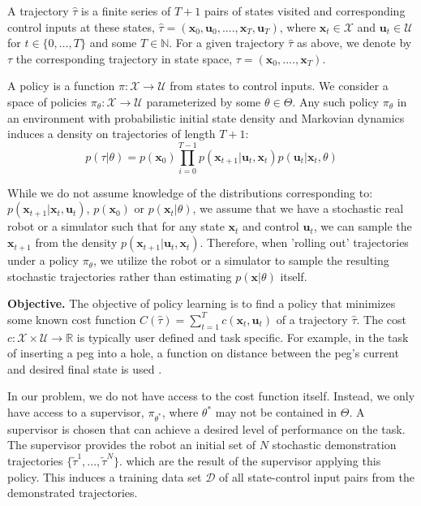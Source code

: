 \documentclass[10pt, conference]{ieeeconf}      %
\newcommand{\bu}{\mathbf{u}}
\newcommand{\bx}{\mathbf{x}}
\begin{document}
A trajectory $\hat{\tau}$ is a finite series of $T+1$ pairs of states visited and corresponding
control inputs at these states, $\hat{\tau} = (\mathbf{x}_0,\mathbf{u}_0, ...., \mathbf{x}_T,\mathbf{u}_T)$, where $\bx_t\in \mathcal{X}$
and $\bu_t\in \mathcal{U}$ for $t\in \{0, \ldots, T\}$ and some $T\in \mathbb{N}$.  
For a given trajectory $\hat{\tau}$ as above, we denote by ${\tau}$ the corresponding trajectory in state space,
${\tau} = (\bx_0,....,\bx_T)$.


A policy is a function $\pi: \mathcal{X} \to \mathcal{U}$ from states to control inputs. 
We consider a space of policies $\pi_{\theta}:\mathcal{X}\to \mathcal{U}$ parameterized by some $\theta\in \Theta$. Any such policy $\pi_{\theta}$ in an environment with probabilistic initial state density and Markovian dynamics
induces a density on trajectories of length $T+1$: $$p(\tau | \theta)=
p(\bx_0)\prod_{i=0}^{T-1}p(\bx_{t+1}|\bu_t,\bx_t)p(\bu_t|\bx_t,\theta)$$


While we do not assume knowledge of the distributions corresponding to: $p(\bx_{t+1}|\bx_t,\bu_t)$, $p(\bx_0)$ or $p(\bx_t|
\theta)$, we assume that we have a stochastic real robot or a simulator such that for any state
$\bx_t$ and control $\bu_t$, we can sample the $\bx_{t+1}$ from the density $p(\bx_{t+1}|\bu_t,\bx_t)$. 
Therefore, when 'rolling out' trajectories under a policy
$\pi_{\theta}$, we utilize the robot or a simulator to sample the resulting stochastic trajectories rather than
estimating $p(\bx|\theta)$ itself.


\noindent\textbf{Objective.} The objective of  policy learning is to find a policy that minimizes some known cost function $C(\hat{\tau}) = \sum^T_{t=1} c(\bx_t,\bu_t)$ of a trajectory $\hat{\tau}$. The cost $c:\mathcal{X}\times \mathcal{U}\to \mathbb{R}$ is typically user defined and task specific. 
For example, in the task of inserting a peg into a hole, a function on distance between the peg's current and desired final state is used \cite{levine2015end}.  

In our problem, we do not have access to the cost function itself. Instead, we only have access to 
a supervisor, $\pi_{\theta^*}$, where $\theta^*$ may not be contained in $\Theta$. A supervisor is chosen that can achieve a desired level of performance on the task. The supervisor provides the robot an initial set
of $N$ stochastic demonstration trajectories $\lbrace \tilde{\tau}^1,...,\tilde{\tau}^N \rbrace$. 
which are the result of the supervisor applying this policy. This induces a training data set $\mathcal{D}$ of all state-control input pairs from the demonstrated trajectories.
\end{document}
